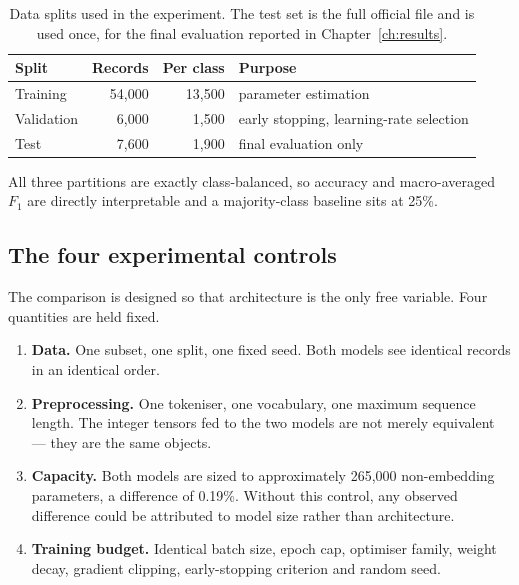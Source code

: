 \begin{table}[ht]
\centering
\caption{Data splits used in the experiment. The test set is the full official file and is used
once, for the final evaluation reported in Chapter~\ref{ch:results}.}
\label{tab:splits}
\begin{tabular}{lrrl}
\toprule
\textbf{Split} & \textbf{Records} & \textbf{Per class} & \textbf{Purpose} \\
\midrule
Training   & 54{,}000 & 13{,}500 & parameter estimation \\
Validation & 6{,}000  & 1{,}500  & early stopping, learning-rate selection \\
Test       & 7{,}600  & 1{,}900  & final evaluation only \\
\bottomrule
\end{tabular}
\end{table}

All three partitions are exactly class-balanced, so accuracy and macro-averaged $F_1$
are directly interpretable and a majority-class baseline sits at 25\%.

\subsection{The four experimental controls}

The comparison is designed so that architecture is the only free variable. Four quantities are held
fixed.

\begin{enumerate}
\item \textbf{Data.} One subset, one split, one fixed seed. Both models see identical records in an
      identical order.

\item \textbf{Preprocessing.} One tokeniser, one vocabulary, one maximum sequence length. The
      integer tensors fed to the two models are not merely equivalent --- they are the same
      objects.

\item \textbf{Capacity.} Both models are sized to approximately 265{,}000 non-embedding
      parameters, a difference of 0.19\%. Without this control, any observed difference could be
      attributed to model size rather than architecture.

\item \textbf{Training budget.} Identical batch size, epoch cap, optimiser family, weight decay,
      gradient clipping, early-stopping criterion and random seed.
\end{enumerate}

